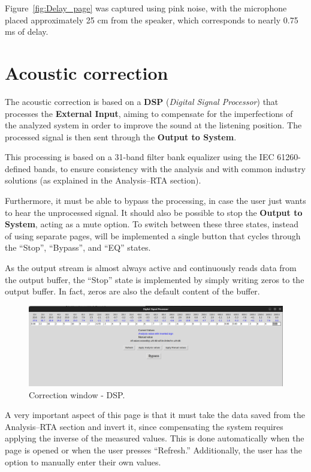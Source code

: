 Figure~\ref{fig:Delay_page} was captured using pink noise, with the microphone placed approximately 25 cm from the speaker, which corresponds to nearly 0.75 ms of delay.


\section{Acoustic correction}

The acoustic correction is based on a \textbf{DSP} (\textit{Digital Signal Processor}) that processes the \textbf{External Input}, aiming to compensate for the imperfections of the analyzed system in order to improve the sound at the listening position. The processed signal is then sent through the \textbf{Output to System}.

This processing is based on a 31-band filter bank equalizer using the IEC 61260-defined bands, to ensure consistency with the analysis and with common industry solutions (as explained in the Analysis–RTA section).

Furthermore, it must be able to bypass the processing, in case the user just wants to hear the unprocessed signal. It should also be possible to stop the \textbf{Output to System}, acting as a mute option. To switch between these three states, instead of using separate pages, will be implemented a single button that cycles through the “Stop”, “Bypass”, and “EQ” states.

As the output stream is almost always active and continuously reads data from the output buffer, the “Stop” state is implemented by simply writing zeros to the output buffer. In fact, zeros are also the default content of the buffer.

\begin{figure}[H]
	\centering
	\includegraphics[width=1
	\linewidth]{Figures/DSP_page.png}
	\caption{Correction window - DSP.}
	\label{fig:DSP_page}
\end{figure}

A very important aspect of this page is that it must take the data saved from the Analysis–RTA section and invert it, since compensating the system requires applying the inverse of the measured values. This is done automatically when the page is opened or when the user presses “Refresh.” Additionally, the user has the option to manually enter their own values.


